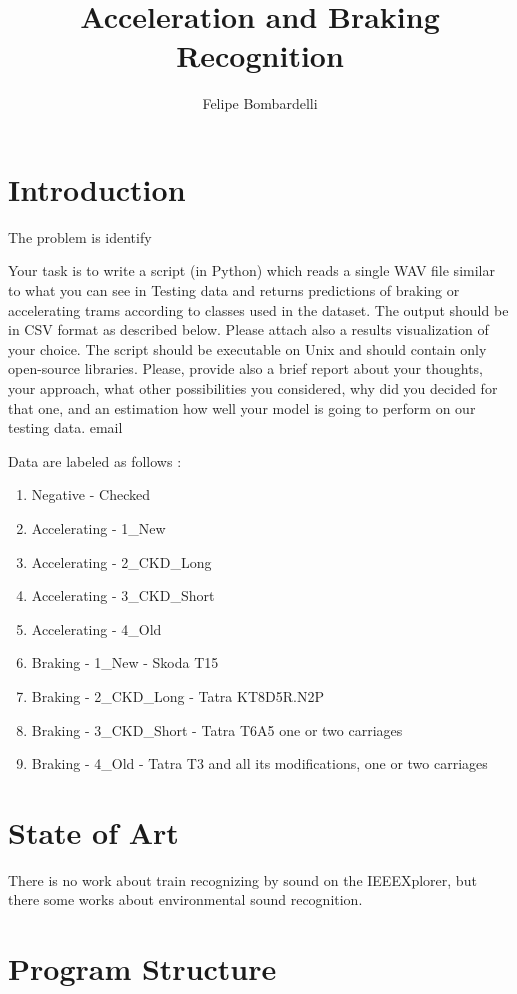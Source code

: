 \documentclass[12pt,oneside,a4paper]{article}
\title{Acceleration and Braking Recognition}
\author{Felipe Bombardelli}
\begin{document}
\maketitle

\section{Introduction}

The problem is identify

Your task is to write a script (in Python) which reads a single WAV file similar to what you can see in Testing data and returns predictions of braking or accelerating trams according to classes used in the dataset. The output should be in CSV format as described below. Please attach also a results visualization of your choice. The script should be executable on Unix and should contain only open-source libraries.
Please, provide also a brief report about your thoughts, your approach, what other possibilities you considered, why did you decided for that one, and an estimation how well your model is going to perform on our testing data.
email


Data are labeled as follows :

\begin{enumerate}
	\item Negative - Checked
	\item Accelerating - 1\_New
	\item Accelerating - 2\_CKD\_Long
	\item Accelerating - 3\_CKD\_Short
	\item Accelerating - 4\_Old
	\item Braking - 1\_New - Skoda T15
	\item Braking - 2\_CKD\_Long - Tatra KT8D5R.N2P
	\item Braking - 3\_CKD\_Short - Tatra T6A5 one or two carriages
	\item Braking - 4\_Old - Tatra T3 and all its modifications, one or two carriages
\end{enumerate}


\section{State of Art}

There is no work about train recognizing by sound on the IEEEXplorer, but there some
works about environmental sound recognition.


\section{Program Structure}
\end{document}
